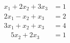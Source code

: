 \begin{align*}
x_1 + 2x_2 + 3x_3 &= 1\\
2x_1 - x_2 + x_3 &= 2\\
3x_1 + x_2 + x_3 &= 4\\
\quad 5x_2 + 2x_3 &= 1
\end{align*}